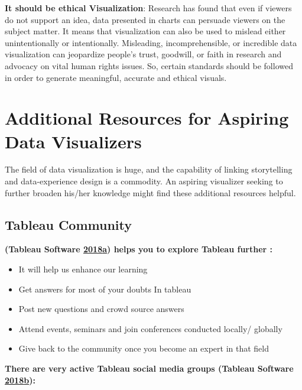 \documentclass[]{book}
\providecommand{\tightlist}{%
  \setlength{\itemsep}{0pt}\setlength{\parskip}{0pt}}
\begin{document}
\textbf{It should be ethical Visualization}:
Research has found that even if viewers do not support an idea, data presented in charts can persuade viewers on the subject matter. It means that visualization can also be used to mislead either unintentionally or intentionally. Misleading, incomprehensible, or incredible data visualization can jeopardize people's trust, goodwill, or faith in research and advocacy on vital human rights issues. So, certain standards should be followed in order to generate meaningful, accurate and ethical visuals.

\hypertarget{additional-resources-for-aspiring-data-visualizers}{%
\section{Additional Resources for Aspiring Data Visualizers}\label{additional-resources-for-aspiring-data-visualizers}}

The field of data visualization is huge, and the capability of linking storytelling and data-experience design is a commodity. An aspiring visualizer seeking to further broaden his/her knowledge might find these additional resources helpful.

\hypertarget{tableau-community-1}{%
\subsection{Tableau Community}\label{tableau-community-1}}

\textbf{(Tableau Software \protect\hyperlink{ref-Tableau_Community}{2018}\protect\hyperlink{ref-Tableau_Community}{a}) helps you to explore Tableau further :}

\begin{itemize}
\tightlist
\item
  It will help us enhance our learning
\item
  Get answers for most of your doubts In tableau
\item
  Post new questions and crowd source answers
\item
  Attend events, seminars and join conferences conducted locally/ globally
\item
  Give back to the community once you become an expert in that field
\end{itemize}

\textbf{There are very active Tableau social media groups (Tableau Software \protect\hyperlink{ref-LinkedIn_Groups}{2018}\protect\hyperlink{ref-LinkedIn_Groups}{b}):}
\end{document}
